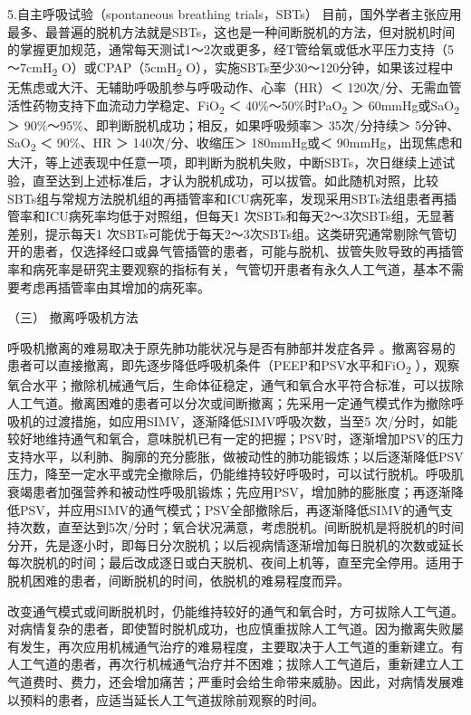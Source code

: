 5.自主呼吸试验（spontaneous breathing trials，SBTs）
目前，国外学者主张应用最多、最普遍的脱机方法就是SBTs，这也是一种间断脱机的方法，但对脱机时间的掌握更加规范，通常每天测试1～2次或更多，经T管给氧或低水平压力支持（5～7cmH\textsubscript{2}
O）或CPAP（5cmH\textsubscript{2}
O），实施SBTs至少30～120分钟，如果该过程中无焦虑或大汗、无辅助呼吸肌参与呼吸动作、心率（HR）＜
120次/分、无需血管活性药物支持下血流动力学稳定、FiO\textsubscript{2} ＜
40\%～50\%时PaO\textsubscript{2} ＞ 60mmHg或SaO\textsubscript{2} ＞
90\%～95\%、即判断脱机成功；相反，如果呼吸频率＞ 35次/分持续＞
5分钟、SaO\textsubscript{2} ＜ 90\%、HR ＞ 140次/分、收缩压＞
180mmHg或＜
90mmHg，出现焦虑和大汗，等上述表现中任意一项，即判断为脱机失败，中断SBTs，次日继续上述试验，直至达到上述标准后，才认为脱机成功，可以拔管。如此随机对照，比较SBTs组与常规方法脱机组的再插管率和ICU病死率，发现采用SBTs法组患者再插管率和ICU病死率均低于对照组，但每天1
次SBTs和每天2～3次SBTs组，无显著差别，提示每天1
次SBTs可能优于每天2～3次SBTs组。这类研究通常剔除气管切开的患者，仅选择经口或鼻气管插管的患者，可能与脱机、拔管失败导致的再插管率和病死率是研究主要观察的指标有关，气管切开患者有永久人工气道，基本不需要考虑再插管率由其增加的病死率。

\hypertarget{text00371.htmlux5cux23CHP16-3-5-3-3}{}
（三） 撤离呼吸机方法

呼吸机撤离的难易取决于原先肺功能状况与是否有肺部并发症各异
。撤离容易的患者可以直接撤离，即先逐步降低呼吸机条件（PEEP和PSV水平和FiO\textsubscript{2}
），观察氧合水平；撤除机械通气后，生命体征稳定，通气和氧合水平符合标准，可以拔除人工气道。撤离困难的患者可以分次或间断撤离；先采用一定通气模式作为撤除呼吸机的过渡措施，如应用SIMV，逐渐降低SIMV呼吸次数，当至5
次/分时，如能较好地维持通气和氧合，意味脱机已有一定的把握；PSV时，逐渐增加PSV的压力支持水平，以利肺、胸廓的充分膨胀，做被动性的肺功能锻炼；以后逐渐降低PSV压力，降至一定水平或完全撤除后，仍能维持较好呼吸时，可以试行脱机。呼吸肌衰竭患者加强营养和被动性呼吸肌锻炼；先应用PSV，增加肺的膨胀度；再逐渐降低PSV，并应用SIMV的通气模式；PSV全部撤除后，再逐渐降低SIMV的通气支持次数，直至达到5次/分时；氧合状况满意，考虑脱机。间断脱机是将脱机的时间分开，先是逐小时，即每日分次脱机；以后视病情逐渐增加每日脱机的次数或延长每次脱机的时间；最后改成逐日或白天脱机、夜间上机等，直至完全停用。适用于脱机困难的患者，间断脱机的时间，依脱机的难易程度而异。

改变通气模式或间断脱机时，仍能维持较好的通气和氧合时，方可拔除人工气道。对病情复杂的患者，即使暂时脱机成功，也应慎重拔除人工气道。因为撤离失败屡有发生，再次应用机械通气治疗的难易程度，主要取决于人工气道的重新建立。有人工气道的患者，再次行机械通气治疗并不困难；拔除人工气道后，重新建立人工气道费时、费力，还会增加痛苦；严重时会给生命带来威胁。因此，对病情发展难以预料的患者，应适当延长人工气道拔除前观察的时间。

